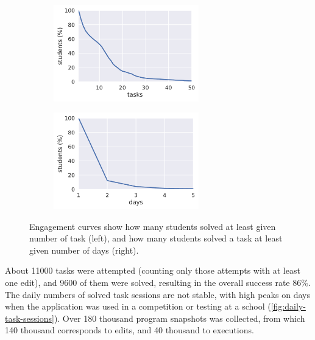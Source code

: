 \begin{figure}[htb]
\centering
\begin{subfigure}{.49\textwidth}
\centering
\includegraphics[height=42mm]{img/engagement-tasks}
\end{subfigure}
\begin{subfigure}{.49\textwidth}
\centering
\includegraphics[height=42mm]{img/engagement-days}
\end{subfigure}
\caption{%
  Engagement curves show how many students solved at least given number of task (left),
  and how many students solved a task at least given number of days (right).}
\label{fig:engagement-curves}
\end{figure}


About 11000 tasks were attempted (counting only those attempts with at least one edit),
and 9600 of them were solved,
resulting in the overall success rate $86\%$.
The daily numbers of solved task sessions are not stable,
with high peaks on days when the application was used
in a competition or testing at a school
(\cref{fig:daily-task-sessions}).
Over 180 thousand program snapshots was collected,
from which 140 thousand corresponds to edits,
and 40 thousand to executions.

